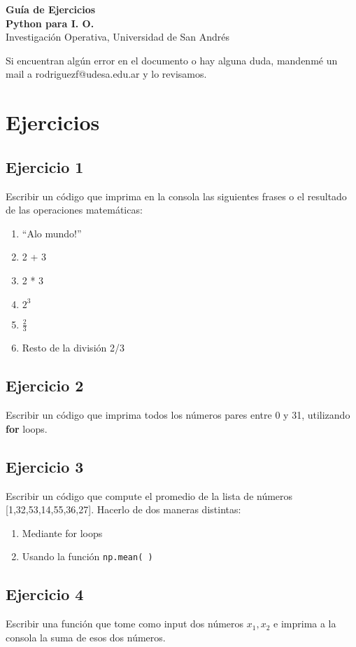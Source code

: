 \documentclass[12pt]{article}
\begin{document}
\begin{center}
    {\LARGE \textbf{Guía de Ejercicios \\Python para I. O.}}\\[0.5em]
    {Investigación Operativa, Universidad de San Andrés}
\end{center}

Si encuentran algún error en el documento o hay alguna duda, mandenmé un mail a rodriguezf@udesa.edu.ar y lo revisamos.

\section{Ejercicios}

\subsection{Ejercicio 1}
Escribir un código que imprima en la consola las siguientes frases o el resultado de las operaciones matemáticas:
\begin{enumerate}[label=\alph*)]
    \item “Alo mundo!”
    \item 2 + 3
    \item 2 * 3
    \item $2^3$
    \item $\frac{2}{3}$
    \item Resto de la división 2/3
\end{enumerate}
    
\subsection{Ejercicio 2}
Escribir un código que imprima todos los números pares entre 0 y 31, utilizando \textbf{for} loops.
    
\subsection{Ejercicio 3}
Escribir un código que compute el promedio de la lista de números [1,32,53,14,55,36,27]. Hacerlo de dos maneras distintas:
\begin{enumerate}[label=\alph*)]
    \item Mediante for loops
    \item Usando la función \texttt{np.mean( )}
\end{enumerate}
    
\subsection{Ejercicio 4}
Escribir una función que tome como input dos números $x_1,x_2$ e imprima a la consola la suma de esos dos números.
    
\end{document}
